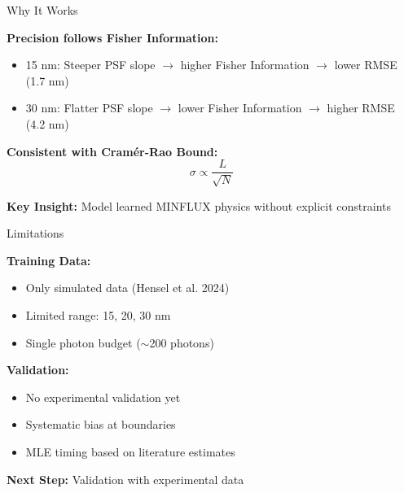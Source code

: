 \documentclass[aspectratio=169]{beamer}
\begin{document}
\begin{frame}{Why It Works}

    \textbf{Precision follows Fisher Information:}
    \begin{itemize}
        \item 15 nm: Steeper PSF slope $\rightarrow$ higher Fisher Information $\rightarrow$ lower RMSE (1.7 nm)
        \item 30 nm: Flatter PSF slope $\rightarrow$ lower Fisher Information $\rightarrow$ higher RMSE (4.2 nm)
    \end{itemize}

    \vspace{0.5cm}

    \textbf{Consistent with Cramér-Rao Bound:}
    \begin{equation*}
        \sigma \propto \frac{L}{\sqrt{N}}
    \end{equation*}

    \vspace{0.5cm}

    \textbf{Key Insight:} Model learned MINFLUX physics without explicit constraints

\end{frame}

\begin{frame}{Limitations}
    
    \textbf{Training Data:}
    \begin{itemize}
        \item Only simulated data (Hensel et al. 2024)
        \item Limited range: 15, 20, 30 nm
        \item Single photon budget ($\sim$200 photons)
    \end{itemize}
    
    \vspace{0.5cm}
    
    \textbf{Validation:}
    \begin{itemize}
        \item No experimental validation yet
        \item Systematic bias at boundaries
        \item MLE timing based on literature estimates
    \end{itemize}
    
    \vspace{0.5cm}
    
    \textbf{Next Step:} Validation with experimental data
    
\end{frame}
\end{document}
